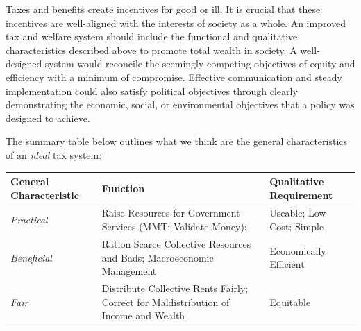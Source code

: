 \documentclass[]{tufte-handout}
\begin{document}
Taxes and benefits create incentives for good or ill. It is crucial that
these incentives are well-aligned with the interests of society as a
whole. An improved tax and welfare system should include the functional
and qualitative characteristics described above to promote total wealth
in society. A well-designed system would reconcile the seemingly
competing objectives of equity and efficiency with a minimum of
compromise. Effective communication and steady implementation could also
satisfy political objectives through clearly demonstrating the economic,
social, or environmental objectives that a policy was designed to
achieve.

The summary table below outlines what we think are the general
characteristics of an \emph{ideal} tax system:

\begin{longtable}[]{@{}lll@{}}
\toprule
\begin{minipage}[b]{0.20\columnwidth}\raggedright
\textbf{General Characteristic}\strut
\end{minipage} & \begin{minipage}[b]{0.47\columnwidth}\raggedright
\textbf{Function}\strut
\end{minipage} & \begin{minipage}[b]{0.24\columnwidth}\raggedright
\textbf{Qualitative Requirement}\strut
\end{minipage}\tabularnewline
\midrule
\endhead
\begin{minipage}[t]{0.20\columnwidth}\raggedright
\emph{Practical}\strut
\end{minipage} & \begin{minipage}[t]{0.47\columnwidth}\raggedright
Raise Resources for Government Services (MMT: Validate Money);\strut
\end{minipage} & \begin{minipage}[t]{0.24\columnwidth}\raggedright
Useable; Low Cost; Simple\strut
\end{minipage}\tabularnewline
\begin{minipage}[t]{0.20\columnwidth}\raggedright
\emph{Beneficial}\strut
\end{minipage} & \begin{minipage}[t]{0.47\columnwidth}\raggedright
Ration Scarce Collective Resources and Bads; Macroeconomic
Management\strut
\end{minipage} & \begin{minipage}[t]{0.24\columnwidth}\raggedright
Economically Efficient\strut
\end{minipage}\tabularnewline
\begin{minipage}[t]{0.20\columnwidth}\raggedright
\emph{Fair}\strut
\end{minipage} & \begin{minipage}[t]{0.47\columnwidth}\raggedright
Distribute Collective Rents Fairly; Correct for Maldistribution of
Income and Wealth\strut
\end{minipage} & \begin{minipage}[t]{0.24\columnwidth}\raggedright
Equitable\strut
\end{minipage}\tabularnewline
\bottomrule
\end{longtable}
\end{document}
